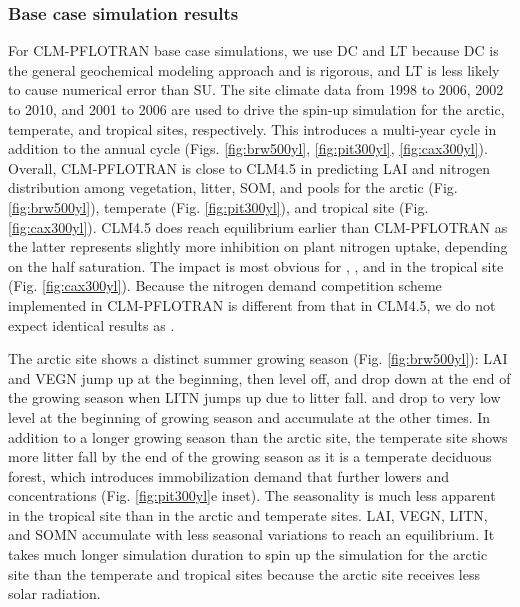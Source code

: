 \documentclass[gmd, manuscript]{copernicus}
\begin{document}
\subsubsection{Base case simulation results}
For CLM-PFLOTRAN base case simulations, we use DC  and LT because DC is the
general geochemical modeling approach and is rigorous, and LT is less likely to
cause numerical error than SU. The site climate data from 1998 to 2006, 2002 to
2010, and 2001 to 2006  are used to drive the spin-up simulation for the arctic,
temperate, and tropical sites, respectively. This introduces a multi-year cycle
in addition to the annual cycle (Figs. \ref{fig:brw500yl}, \ref{fig:pit300yl},
\ref{fig:cax300yl}). Overall, CLM-PFLOTRAN is close to CLM4.5 in
predicting LAI and nitrogen distribution among vegetation, litter, SOM,
 and  pools for the arctic (Fig. \ref{fig:brw500yl}),
temperate (Fig. \ref{fig:pit300yl}), and tropical site (Fig. \ref{fig:cax300yl}). %
CLM4.5 does reach equilibrium earlier than CLM-PFLOTRAN as the latter represents 
slightly more inhibition on plant nitrogen uptake, depending on the half
saturation. The impact is most obvious for , , and
 in the tropical site (Fig. \ref{fig:cax300yl}). Because the
nitrogen demand competition scheme implemented in CLM-PFLOTRAN is different
from that in CLM4.5, we do not expect identical results as \citet{Fang2013}. 

The arctic site shows a distinct summer growing season (Fig.
\ref{fig:brw500yl}): LAI and VEGN jump up at the beginning, then level off, and
drop down at the end of the growing season when LITN jumps up due to litter fall.
 and  drop to very low level at the beginning of
growing season and accumulate at the other times. In addition to a longer growing
season than the arctic site, the temperate site shows more litter fall by the
end of the growing season as it is a temperate deciduous forest, which introduces
immobilization demand that further lowers  and 
concentrations (Fig. \ref{fig:pit300yl}e inset). The seasonality is much less
apparent in the tropical site than in the arctic and temperate sites. LAI,
VEGN, LITN, and SOMN accumulate with less seasonal variations to reach an
equilibrium. It takes much longer simulation duration to spin up the simulation
for the arctic site than the temperate and tropical sites because the arctic site
receives less solar radiation. 
\end{document}
